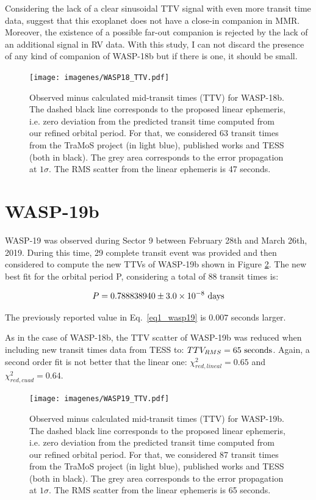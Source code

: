 Considering the lack of a clear sinusoidal TTV signal with even more transit time data, suggest that this exoplanet does not have a close-in companion in MMR. Moreover, the existence of a possible far-out companion is rejected by the lack of an additional signal in RV data. With this study, I can not discard the presence of any kind of companion of WASP-18b but if there is one, it should be small. 


\begin{figure}[h]
\texttt{[image: imagenes/WASP18\_TTV.pdf]}
\caption{Observed minus calculated mid-transit times (TTV) for WASP-18b. The dashed black line corresponds to the proposed linear ephemeris, i.e. zero deviation from the predicted transit time  computed from our refined orbital period. For that, we considered 63 transit times from the TraMoS project (in light blue), published works and TESS (both in black). The grey area corresponds to the error propagation at $1\sigma$. The RMS scatter from the linear ephemeris is 47 seconds.}
\label{wasp18_ttv}
\end{figure}

\section{WASP-19b}

WASP-19 was observed during Sector 9 between February 28th and March 26th, 2019. During this time, 29 complete transit event was provided and then considered to compute the new TTVs of WASP-19b shown in Figure \ref{wasp19_ttv}. The new best fit for the orbital period P, considering a total of 88 transit times is:

\begin{equation}
P = 0.788838940 \pm 3.0\times10^{-8} ~\rm days
\end{equation}

The previously reported value in Eq.~\ref{eq1_wasp19} is $0.007$ seconds larger.

As in the case of WASP-18b, the TTV scatter of WASP-19b was reduced when including new transit times data from TESS to: $TTV_{RMS}=65~\rm seconds$. Again, a second order fit is not better that the linear one: $\chi^{2}_{red,lineal}= 0.65$ and $\chi^{2}_{red,cuad}= 0.64$. 

\begin{figure}[ht]
\texttt{[image: imagenes/WASP19\_TTV.pdf]}
\caption{Observed minus calculated mid-transit times (TTV) for WASP-19b. The dashed black line corresponds to the proposed linear ephemeris, i.e. zero deviation from the predicted transit time  computed from our refined orbital period. For that, we considered 87 transit times from the TraMoS project (in light blue), published works and TESS (both in black). The grey area corresponds to the error propagation at $1\sigma$. The RMS scatter from the linear ephemeris is 65 seconds.}
\label{wasp19_ttv}
\end{figure}


